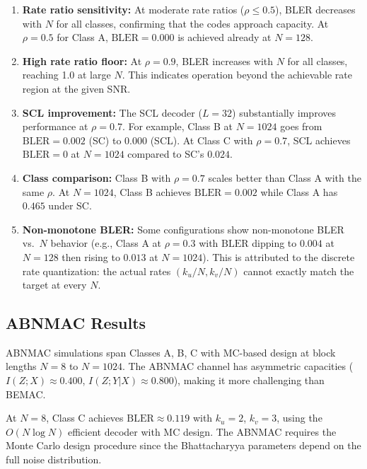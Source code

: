 \documentclass[11pt,a4paper]{article}
\begin{document}
\begin{enumerate}
  \item \textbf{Rate ratio sensitivity:} At moderate rate ratios
        ($\rho \leq 0.5$), BLER decreases with $N$ for all classes, confirming
        that the codes approach capacity. At $\rho = 0.5$ for Class A,
        $\text{BLER} = 0.000$ is achieved already at $N = 128$.

  \item \textbf{High rate ratio floor:} At $\rho = 0.9$, BLER increases
        with $N$ for all classes, reaching 1.0 at large $N$. This indicates
        operation beyond the achievable rate region at the given SNR.

  \item \textbf{SCL improvement:} The SCL decoder ($L = 32$) substantially
        improves performance at $\rho = 0.7$. For example, Class B at
        $N = 1024$ goes from $\text{BLER} = 0.002$ (SC) to $0.000$ (SCL).
        At Class C with $\rho = 0.7$, SCL achieves $\text{BLER} = 0$ at
        $N = 1024$ compared to SC's $0.024$.

  \item \textbf{Class comparison:} Class B with $\rho = 0.7$ scales better
        than Class A with the same $\rho$. At $N = 1024$, Class B achieves
        $\text{BLER} = 0.002$ while Class A has $0.465$ under SC.

  \item \textbf{Non-monotone BLER:} Some configurations show non-monotone
        BLER vs.\ $N$ behavior (e.g., Class A at $\rho = 0.3$ with
        $\text{BLER}$ dipping to $0.004$ at $N = 128$ then rising to $0.013$
        at $N = 1024$). This is attributed to the discrete rate quantization:
        the actual rates $(k_u/N, k_v/N)$ cannot exactly match the target
        at every $N$.
\end{enumerate}

\subsection{ABNMAC Results}

ABNMAC simulations span Classes A, B, C with MC-based design at block lengths
$N = 8$ to $N = 1024$. The ABNMAC channel has asymmetric capacities
($I(Z;X) \approx 0.400$, $I(Z;Y|X) \approx 0.800$), making it more
challenging than BEMAC.

At $N = 8$, Class C achieves $\text{BLER} \approx 0.119$ with $k_u = 2$,
$k_v = 3$, using the $O(N \log N)$ efficient decoder with MC design.
The ABNMAC requires the Monte Carlo design procedure since the
Bhattacharyya parameters depend on the full noise distribution.
\end{document}
